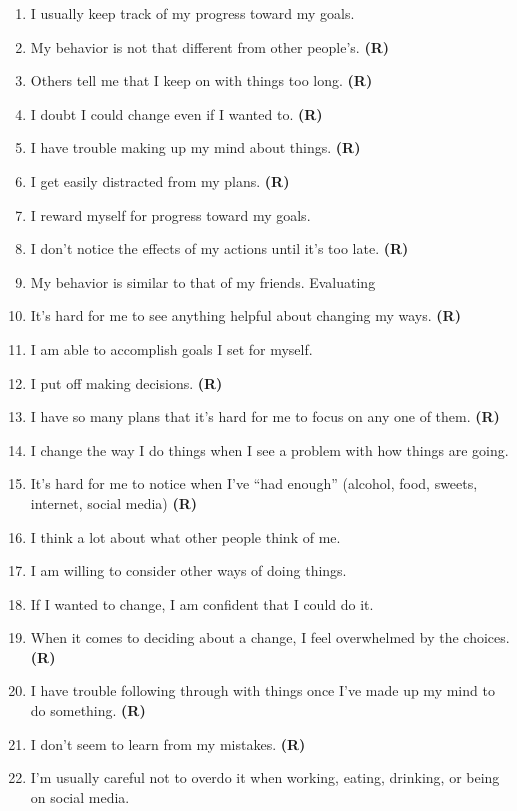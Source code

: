 \documentclass[letterpaper, nobind]{templates/ociamthesis}
\providecommand{\tightlist}{%
  \setlength{\itemsep}{0pt}\setlength{\parskip}{0pt}}
\begin{document}
\begin{enumerate}
\def\labelenumi{\arabic{enumi}.}
\tightlist
\item
  I usually keep track of my progress toward my goals.
\item
  My behavior is not that different from other people's. \textbf{(R)}
\item
  Others tell me that I keep on with things too long. \textbf{(R)}
\item
  I doubt I could change even if I wanted to. \textbf{(R)}
\item
  I have trouble making up my mind about things. \textbf{(R)}
\item
  I get easily distracted from my plans. \textbf{(R)}
\item
  I reward myself for progress toward my goals.
\item
  I don't notice the effects of my actions until it's too late. \textbf{(R)}
\item
  My behavior is similar to that of my friends. Evaluating
\item
  It's hard for me to see anything helpful about changing my ways. \textbf{(R)}
\item
  I am able to accomplish goals I set for myself.
\item
  I put off making decisions. \textbf{(R)}
\item
  I have so many plans that it's hard for me to focus on any one of them. \textbf{(R)}
\item
  I change the way I do things when I see a problem with how things are going.
\item
  It's hard for me to notice when I've ``had enough'' (alcohol, food, sweets, internet, social media) \textbf{(R)}
\item
  I think a lot about what other people think of me.
\item
  I am willing to consider other ways of doing things.
\item
  If I wanted to change, I am confident that I could do it.
\item
  When it comes to deciding about a change, I feel overwhelmed by the choices. \textbf{(R)}
\item
  I have trouble following through with things once I've made up my mind to do something. \textbf{(R)}
\item
  I don't seem to learn from my mistakes. \textbf{(R)}
\item
  I'm usually careful not to overdo it when working, eating, drinking, or being on social media.

\end{enumerate}
\end{document}
